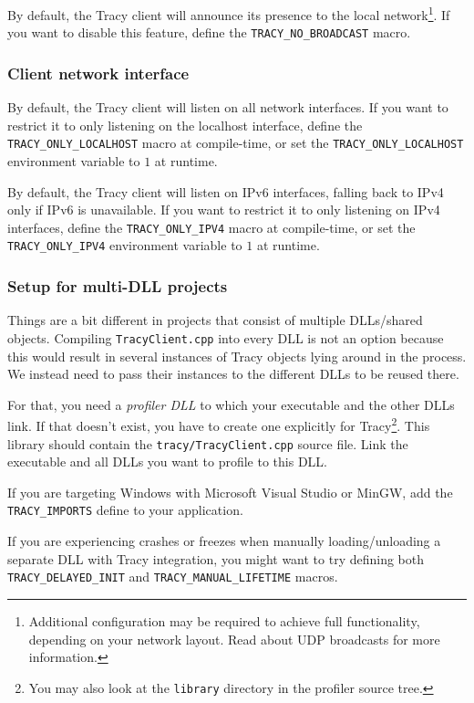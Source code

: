 \documentclass[hidelinks,titlepage,a4paper]{article}
\begin{document}
By default, the Tracy client will announce its presence to the local network\footnote{Additional configuration may be required to achieve full functionality, depending on your network layout. Read about UDP broadcasts for more information.}. If you want to disable this feature, define the \texttt{TRACY\_NO\_BROADCAST} macro.

\subsubsection{Client network interface}

By default, the Tracy client will listen on all network interfaces. If you want to restrict it to only listening on the localhost interface, define the \texttt{TRACY\_ONLY\_LOCALHOST} macro at compile-time, or set the \texttt{TRACY\_ONLY\_LOCALHOST} environment variable to $1$ at runtime.

By default, the Tracy client will listen on IPv6 interfaces, falling back to IPv4 only if IPv6 is unavailable. If you want to restrict it to only listening on IPv4 interfaces, define the \texttt{TRACY\_ONLY\_IPV4} macro at compile-time, or set the \texttt{TRACY\_ONLY\_IPV4} environment variable to $1$ at runtime.

\subsubsection{Setup for multi-DLL projects}

Things are a bit different in projects that consist of multiple DLLs/shared objects. Compiling \texttt{TracyClient.cpp} into every DLL is not an option because this would result in several instances of Tracy objects lying around in the process. We instead need to pass their instances to the different DLLs to be reused there.

For that, you need a \emph{profiler DLL} to which your executable and the other DLLs link. If that doesn't exist, you have to create one explicitly for Tracy\footnote{You may also look at the \texttt{library} directory in the profiler source tree.}. This library should contain the \texttt{tracy/TracyClient.cpp} source file. Link the executable and all DLLs you want to profile to this DLL.

If you are targeting Windows with Microsoft Visual Studio or MinGW, add the \texttt{TRACY\_IMPORTS} define to your application.

If you are experiencing crashes or freezes when manually loading/unloading a separate DLL with Tracy integration, you might want to try defining both \texttt{TRACY\_DELAYED\_INIT} and \texttt{TRACY\_MANUAL\_LIFETIME} macros.
\end{document}
